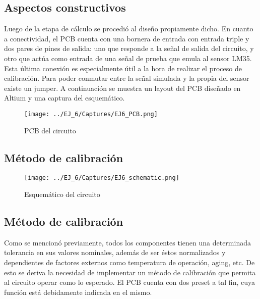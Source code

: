  \subsection{Aspectos constructivos}

 Luego de la etapa de c\'alculo se procedi\'o al dise\~no propiamente dicho. En cuanto a conectividad, el PCB cuenta con una bornera de entrada con entrada triple y dos pares de pines de salida: uno que responde a la señal de salida del circuito, y otro que actúa como entrada de una señal de prueba que emula al sensor LM35.
  Esta \'ultima conexi\'on es especialmente \'util a la hora de realizar el proceso de calibraci\'on. Para poder conmutar entre la se\~nal simulada y la propia del sensor existe un jumper. A continuaci\'on se muestra un layout del PCB diseñado en Altium y una captura del esquem\'atico.
 
  \begin{figure}[H]
    \centering
    \texttt{[image: ../EJ\_6/Captures/EJ6\_PCB.png]}
    \caption{PCB del circuito}
    \label{fig:EJ6_PCB} 
\end{figure}
 \subsection{M\'etodo de calibraci\'on}

 \begin{figure}[H]
    \centering
    \texttt{[image: ../EJ\_6/Captures/EJ6\_schematic.png]}
    \caption{Esquem\'atico del circuito}
    \label{fig:EJ6_schematic} 
\end{figure}

 \subsection{M\'etodo de calibraci\'on}

 Como se mencion\'o previamente, todos los componentes tienen una determinada tolerancia en sus valores nominales, adem\'as de ser \'estos normalizados y dependientes de factores externos como temperatura de operaci\'on, aging, etc.
  De esto se deriva la necesidad de implementar un m\'etodo de calibraci\'on que permita al circuito operar como lo esperado. El PCB cuenta con dos preset a tal fin, cuya funci\'on est\'a debidamente indicada en el mismo.
